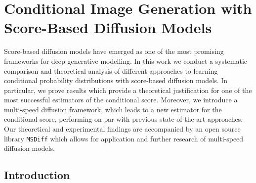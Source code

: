 
\chapter{Conditional Image Generation with Score-Based Diffusion Models}

\ifpdf
    \graphicspath{{Chapter2/Figs/Raster/}{Chapter2/Figs/PDF/}{Chapter2/Figs/}}
\else
    \graphicspath{{Chapter2/Figs/Vector/}{Chapter2/Figs/}}
\fi


Score-based diffusion models have emerged as one of the most promising frameworks for deep generative modelling. In this work we conduct a systematic comparison and theoretical analysis of different approaches to learning conditional probability distributions with score-based diffusion models. In particular, we prove results which provide a theoretical justification for one of the most successful estimators of the conditional score. Moreover, we introduce a multi-speed diffusion framework, which leads to a new estimator for the conditional score, performing on par with previous state-of-the-art approaches. Our theoretical and experimental findings are accompanied by an open source library \texttt{MSDiff} which allows for application and further research of multi-speed diffusion models.

\section{Introduction}

